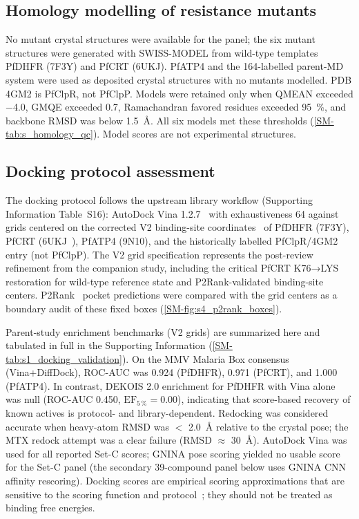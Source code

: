 \documentclass[journal=jcisd8,manuscript=article,layout=traditional]{achemso}
\begin{document}
\subsection{Homology modelling of resistance mutants}

No mutant crystal structures were available for the panel; the six mutant structures were generated with SWISS-MODEL from wild-type templates PfDHFR (7F3Y) and PfCRT (6UKJ). PfATP4 and the 164-labelled parent-MD system were used as deposited crystal structures with no mutants modelled. PDB 4GM2 is PfClpR, not PfClpP. Models were retained only when QMEAN exceeded \num{-4.0}, GMQE exceeded \num{0.7}, Ramachandran favored residues exceeded \qty{95}{\percent}, and backbone RMSD was below \qty{1.5}{\angstrom}. All six models met these thresholds (\cref{SM-tab:s_homology_qc}). Model scores are not experimental structures.

\subsection{Docking protocol assessment}

The docking protocol follows the upstream library workflow (Supporting Information Table~S16): AutoDock Vina 1.2.7~\citep{vina_2021} with exhaustiveness \num{64} against grids centered on the corrected V2 binding-site coordinates~\citep{Temgoua2026} of PfDHFR (7F3Y), PfCRT (6UKJ~\citep{Kim2019PfCRT}), PfATP4 (9N10), and the historically labelled PfClpR/4GM2 entry (not PfClpP). The V2 grid specification represents the post-review refinement from the companion study, including the critical PfCRT K76→LYS restoration for wild-type reference state and P2Rank-validated binding-site centers. P2Rank~\citep{Krivak2018P2Rank} pocket predictions were compared with the grid centers as a boundary audit of these fixed boxes (\cref{SM-fig:s4_p2rank_boxes}).

Parent-study enrichment benchmarks (V2 grids) are summarized here and tabulated in full in the Supporting Information (\cref{SM-tab:s1_docking_validation}). On the MMV Malaria Box consensus (Vina+DiffDock), ROC-AUC was \num{0.924} (PfDHFR), \num{0.971} (PfCRT), and \num{1.000} (PfATP4). In contrast, DEKOIS 2.0 enrichment for PfDHFR with Vina alone was null (ROC-AUC \num{0.450}, $\mathrm{EF}_{5\,\%} = \num{0.00}$), indicating that score-based recovery of known actives is protocol- and library-dependent. Redocking was considered accurate when heavy-atom RMSD was $<$ \qty{2.0}{\angstrom} relative to the crystal pose; the MTX redock attempt was a clear failure (RMSD $\approx$ \qty{30}{\angstrom}). AutoDock Vina was used for all reported Set-C scores; GNINA pose scoring yielded no usable score for the Set-C panel (the secondary 39-compound panel below uses GNINA CNN affinity rescoring). Docking scores are empirical scoring approximations that are sensitive to the scoring function and protocol~\citep{ferreira2023docking,sadybekov2023computational,kittelson2026docking}; they should not be treated as binding free energies.
\end{document}

